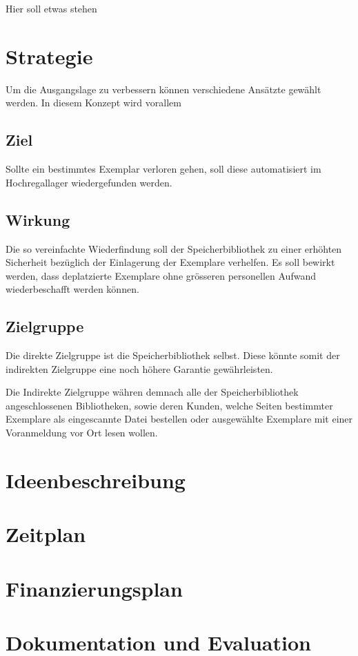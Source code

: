 Hier soll etwas stehen

\chapter{Strategie}
Um die Ausgangslage zu verbessern können verschiedene Ansätzte gewählt werden. In diesem Konzept wird vorallem

\section{Ziel}
Sollte ein bestimmtes Exemplar verloren gehen, soll diese automatisiert im Hochregallager wiedergefunden werden.

\section{Wirkung}
Die so vereinfachte Wiederfindung soll der Speicherbibliothek zu einer erhöhten Sicherheit bezüglich der Einlagerung der Exemplare verhelfen. Es soll bewirkt werden, dass deplatzierte Exemplare ohne grösseren personellen Aufwand wiederbeschafft werden können.

\section{Zielgruppe}
Die direkte Zielgruppe ist die Speicherbibliothek selbst. Diese könnte somit der indirekten Zielgruppe eine noch höhere Garantie gewährleisten.

Die Indirekte Zielgruppe währen demnach alle der Speicherbibliothek angeschlossenen Bibliotheken, sowie deren Kunden, welche Seiten bestimmter Exemplare als eingescannte Datei bestellen oder ausgewählte Exemplare mit einer Voranmeldung vor Ort lesen wollen.

\chapter{Ideenbeschreibung}

\chapter{Zeitplan}

\chapter{Finanzierungsplan}

\chapter{Dokumentation und Evaluation}